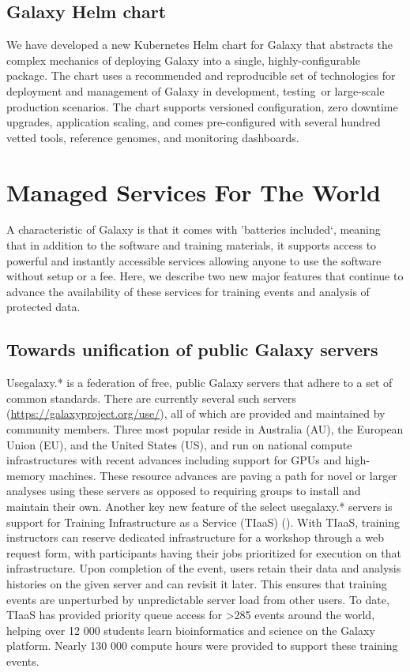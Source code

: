 \subsection*{Galaxy Helm chart}

We have developed a new Kubernetes Helm chart for Galaxy that abstracts the complex mechanics of deploying Galaxy into a single, highly-configurable package. The chart uses a recommended and reproducible set of technologies for deployment and management of Galaxy in development, testing or large-scale production scenarios. The chart supports versioned configuration, zero downtime upgrades, application scaling, and comes pre-configured with several hundred vetted tools, reference genomes, and monitoring dashboards.

\section*{Managed Services For The World}
A characteristic of Galaxy is that it comes with 'batteries included`, meaning that in addition to the software and training materials, it supports access to powerful and instantly accessible services allowing anyone to use the software without setup or a fee. Here, we describe two new major features that continue to advance the availability of these services for training events and analysis of protected data.

\subsection*{Towards unification of public Galaxy servers}
Usegalaxy.* is a federation of free, public Galaxy servers that adhere to a set of common standards. There are currently several such servers (\url{https://galaxyproject.org/use/}), all of which are provided and maintained by community members. Three most popular reside in Australia (AU), the European Union (EU), and the United States (US), and run on national compute infrastructures with recent advances including support for GPUs and high-memory machines. These resource advances are paving a path for novel or larger analyses using these servers as opposed to requiring groups to install and maintain their own. Another key new feature of the select usegalaxy.* servers is support for Training Infrastructure as a Service (TIaaS) (\cite{Rasche_2020}). With TIaaS, training instructors can reserve dedicated infrastructure for a workshop through a web request form, with participants having their jobs prioritized for execution on that infrastructure. Upon completion of the event, users retain their data and analysis histories on the given server and can revisit it later. This ensures that training events are unperturbed by unpredictable server load from other users. To date, TIaaS has provided priority queue access for >285 events around the world, helping over 12 000 students learn bioinformatics and science on the Galaxy platform. Nearly 130 000 compute hours were provided to support these training events.


